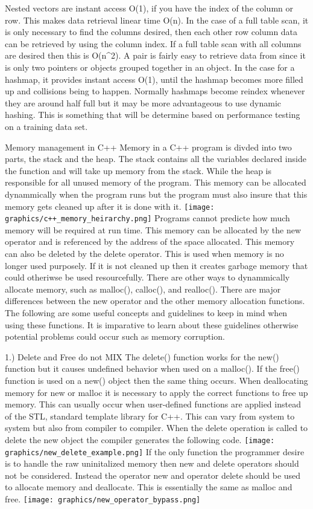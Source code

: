 \documentclass[letterpaper, 12pt]{article}
\begin{document}
	Nested vectors are instant access O(1), if you have the index of the column or row. This makes data retrieval
	linear time O(n). In the case of a full table scan, it is only necessary to find the columns desired, then each other row
	column data can be retrieved by using the column index. If a full table scan with all columns are desired then this is O(n^2). A pair is fairly easy to retrieve data from since it is only two pointers or objects grouped together in an object. In the case for a hashmap, it provides instant access O(1), until the hashmap becomes more filled up and collisions being to happen. Normally hashmaps become reindex whenever they are around half full but it may be more advantageous to use dynamic hashing. This is something that will be determine based on performance testing on a training data set.

Memory management in C++
	Memory in a C++ program is divded into two parts, the stack and the heap. The stack contains all the variables
	declared inside the function and will take up memory from the stack. While the heap is responsible for all unused memory 
	of the program. This memory can be allocated dynammically when the program runs but the program must also insure that this memory gets cleaned up after it is done with it.
	\texttt{[image: graphics/c++\_memory\_heirarchy.png]}
	\cite{newerror}
	Programs cannot predicte how much memory will be required at run time. This memory can be allocated by the new operator and is referenced by the address of the space allocated. This memory can also be deleted by the delete operator. This is used when memory is no longer used purposely. If it is not cleaned up then it creates garbage memory that could otheriwse be used resourcefully. There are other ways to dynammically allocate memory, such as malloc(), calloc(), and realloc(). There are major differences between the new operator and the other memory allocation functions.  The following are some useful concepts and guidelines to keep in mind when using these functions. It is imparative to learn about these guidelines otherwise potential problems could occur such as memory corruption.

1.) Delete and Free do not MIX
	The delete() function works for the new() function but it causes undefined behavior when used on a malloc(). If the free() function is used on a new() object then the same thing occurs. When deallocating memory for new or malloc it is necessary to apply the correct functions to free up memory. This can usually occur when user-defined functions are applied instead of the STL, standard template library for C++. This can vary from system to system but also from compiler to compiler. When the delete operation is called to delete the new object the compiler generates the following code.
	\texttt{[image: graphics/new\_delete\_example.png]}
	If the only function the programmer desire is to handle the raw uninitalized memory then new and delete operators should not be considered. Instead the operator new and operator delete should be used to allocate memory and deallocate. This is essentially the same as malloc and free.
	\texttt{[image: graphics/new\_operator\_bypass.png]}
	\cite{boostuse}
\end{document}

